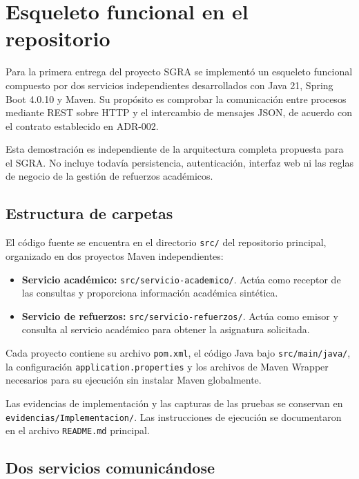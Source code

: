 \section{Esqueleto funcional en el repositorio}

Para la primera entrega del proyecto SGRA se implementó un esqueleto funcional compuesto por dos servicios independientes desarrollados con Java 21, Spring Boot 4.0.10 y Maven. Su propósito es comprobar la comunicación entre procesos mediante REST sobre HTTP y el intercambio de mensajes JSON, de acuerdo con el contrato establecido en ADR-002.

Esta demostración es independiente de la arquitectura completa propuesta para el SGRA. No incluye todavía persistencia, autenticación, interfaz web ni las reglas de negocio de la gestión de refuerzos académicos.

\subsection{Estructura de carpetas}

El código fuente se encuentra en el directorio \texttt{src/} del repositorio principal, organizado en dos proyectos Maven independientes:

\begin{itemize}
    \item \textbf{Servicio académico:} \texttt{src/servicio-academico/}. Actúa como receptor de las consultas y proporciona información académica sintética.

    \item \textbf{Servicio de refuerzos:} \texttt{src/servicio-refuerzos/}. Actúa como emisor y consulta al servicio académico para obtener la asignatura solicitada.
\end{itemize}

Cada proyecto contiene su archivo \texttt{pom.xml}, el código Java bajo \texttt{src/main/java/}, la configuración \texttt{application.properties} y los archivos de Maven Wrapper necesarios para su ejecución sin instalar Maven globalmente.

Las evidencias de implementación y las capturas de las pruebas se conservan en \nolinkurl{evidencias/Implementacion/}. Las instrucciones de ejecución se documentaron en el archivo \texttt{README.md} principal.

\subsection{Dos servicios comunicándose}

